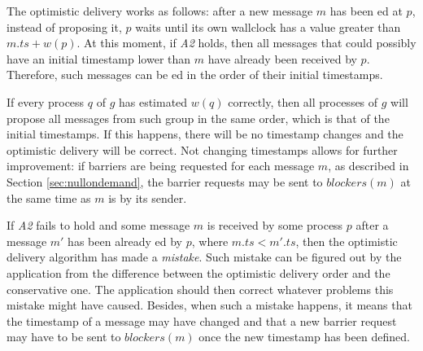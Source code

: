 \documentclass[times, 10pt]{article}
\begin{document}
The optimistic delivery works as follows: after a new message $m$ has been \rmdel{}ed at $p$, instead of proposing it, $p$ %
waits until its own wallclock has a value greater than $m.ts + w(p)$. At this moment, if \emph{A2} holds, then all messages that could possibly have an initial timestamp lower than $m$ have already been received by $p$. Therefore, such messages can be \optdel{}ed in the order of their initial timestamps.

If every process $q$ of $g$ has estimated $w(q)$ correctly, then all processes of $g$ will propose all messages from such group in the same order, which is that of the initial timestamps. If this happens, there will be no timestamp changes and the optimistic delivery will be correct. Not changing timestamps allows for further improvement: if barriers are being requested for each message $m$, as described in Section \ref{sec:nullondemand}, the barrier requests may be sent to $blockers(m)$ at the same time as $m$ is \rmcast{} by its sender.

If \emph{A2} fails to hold and some message $m$ is received by some process $p$ after a message $m'$ has been already \optdel{}ed by $p$, where $m.ts < m'.ts$, then the optimistic delivery algorithm has made a \textit{mistake}. Such mistake can be figured out by the application from the difference between the optimistic delivery order and the conservative one. The application should then correct whatever problems this mistake might have caused. Besides, when such a mistake happens, it means that the timestamp of a message may have changed and that a new barrier request may have to be sent to $blockers(m)$ once the new timestamp has been defined.


\end{document}

